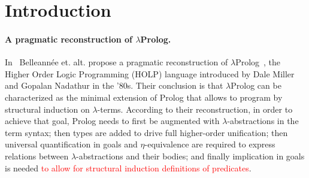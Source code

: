 \documentclass{easychair}
\begin{document}
\begin{abstract}


\end{abstract}

\section{Introduction}\label{sec:introduction}

\paragraph{A pragmatic reconstruction of $\lambda$Prolog.}

In~\cite{jlp98} Belleannée et. alt. propose a pragmatic reconstruction
of $\lambda$Prolog~\cite{lambdap1,lambdap2,lambdap3}, the Higher Order
Logic Programming (HOLP) language introduced by Dale Miller and
Gopalan Nadathur in the '80s.
Their conclusion is that $\lambda$Prolog can be characterized as the
minimal extension of Prolog that allows to program by structural
induction on $\lambda$-terms. According to their reconstruction, in
order to achieve that goal, Prolog needs to first be augmented with
$\lambda$-abstractions in the term syntax; then types are added to
drive full higher-order unification; then universal quantification in
goals and $\eta$-equivalence are required to express relations between
$\lambda$-abstractions and their bodies; and finally implication in
goals is needed \textcolor{red}{to allow for structural induction definitions of
predicates}.
\end{document}
